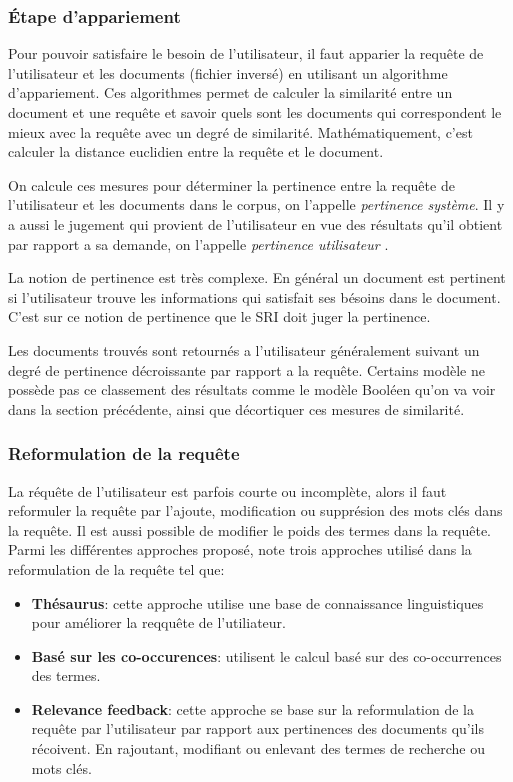 \subsubsection{Étape d’appariement}
Pour pouvoir satisfaire le besoin de l'utilisateur, il faut apparier la requête de l'utilisateur et les documents (fichier inversé) en utilisant un algorithme d'appariement. Ces algorithmes permet de calculer la similarité entre un document et une requête et savoir quels sont les documents qui correspondent le mieux avec la requête avec un degré de similarité. Mathématiquement, c'est calculer la distance euclidien entre la requête et le document.

On calcule ces mesures pour déterminer la pertinence entre la requête de l'utilisateur et les documents dans le corpus, on l'appelle \textit{pertinence système}. Il y a aussi le jugement qui provient de l'utilisateur en vue des résultats qu'il obtient par rapport a sa demande, on l'appelle \textit{pertinence utilisateur} \citep{vsm-images}.

La notion de pertinence est très complexe. En général un document est pertinent si l'utilisateur trouve les informations qui satisfait ses bésoins dans le document. C'est sur ce notion de pertinence que le SRI doit juger la pertinence. \citep{salton1989automatique}

Les documents trouvés sont retournés a l’utilisateur généralement suivant un degré de pertinence décroissante par rapport a la requête. Certains modèle ne possède pas ce classement des résultats comme le modèle Booléen qu'on va voir dans la section précédente, ainsi que décortiquer ces mesures de similarité.

\subsubsection{Reformulation de la requête}
La réquête de l'utilisateur est parfois courte ou incomplète, alors il faut reformuler la requête par l'ajoute, modification ou supprésion des mots clés dans la requête. Il est aussi possible de modifier le poids des termes dans la requête. Parmi les différentes approches proposé, \citeauthor{amelioration-ri-approche-semantique} \citep{amelioration-ri-approche-semantique} note trois approches utilisé dans la reformulation de la requête tel que:

\begin{itemize}
    \item \textbf{Thésaurus}: cette approche utilise une base de connaissance linguistiques pour améliorer la reqquête de l'utiliateur.
    \item \textbf{Basé sur les co-occurences}: utilisent le calcul basé sur des co-occurrences des termes.
    \item \textbf{Relevance feedback}: cette approche se base sur la reformulation de la requête par l'utilisateur par rapport aux pertinences des documents qu'ils récoivent. En rajoutant, modifiant ou enlevant des termes de recherche ou mots clés.
\end{itemize}

